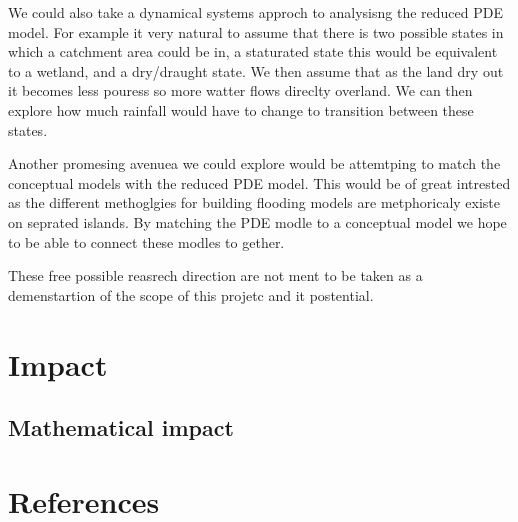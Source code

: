 \documentclass[11pt]{article}
\begin{document}
We could also take a dynamical systems approch to analysisng the reduced PDE model. For example it very natural to assume that there is two possible states in which a catchment area could be in, a staturated state this would be equivalent to a wetland, and a dry/draught state. We then assume that as the land dry out it becomes less pouress so more watter flows direclty overland. We can then explore how much rainfall would have to change to transition between these states.

Another promesing avenuea we could explore would be attemtping to match the conceptual models with the reduced PDE model. This would be of great intrested as the different methoglgies for building flooding models are metphoricaly existe on seprated islands. By matching the PDE modle to a conceptual model we hope to be able to connect these modles to gether.

These free possible reasrech direction are not ment to be taken as a demenstartion of the scope of this projetc and it postential.



\section{Impact}

\subsection{Mathematical impact}

\subsection{}

\section{References}
\end{document}
